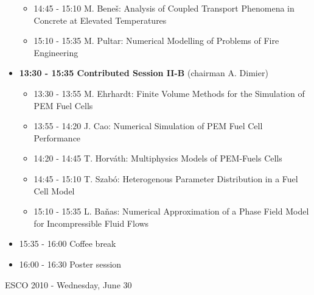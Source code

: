 \documentclass[10pt, A4]{article}%
\begin{document}
\begin{itemize}
\begin{itemize}
    \item 14:45 - 15:10 M. Bene\v{s}: Analysis of Coupled Transport Phenomena in Concrete at Elevated Temperatures
    \item 15:10 - 15:35 M. Pultar: Numerical Modelling of Problems of Fire Engineering
  \end{itemize}
  \item {\bf 13:30 - 15:35 Contributed Session II-B} (chairman A. Dimier) 
  \begin{itemize}
    \item 13:30 - 13:55 M. Ehrhardt: Finite Volume Methods for the Simulation of PEM Fuel Cells
    \item 13:55 - 14:20 J. Cao: Numerical Simulation of PEM Fuel Cell Performance
    \item 14:20 - 14:45 T. Horv\'ath: Multiphysics Models of PEM-Fuels Cells
    \item 14:45 - 15:10 T. Szab\'o: Heterogenous Parameter Distribution in a Fuel Cell Model
    \item 15:10 - 15:35 L. Ba\v nas: Numerical Approximation of a Phase Field Model\\ for Incompressible Fluid Flows
  \end{itemize}
  \item 15:35 - 16:00 Coffee break
  \item 16:00 - 16:30 Poster session
\end{itemize}



\newpage

\centerline{\huge ESCO 2010 - Wednesday, June 30}
\vspace{4mm}
\end{document}
